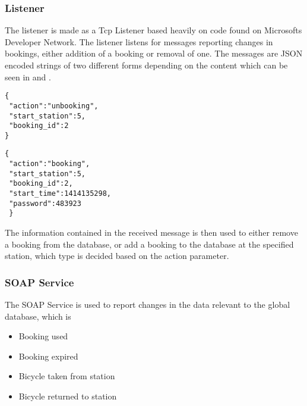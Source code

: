 \subsubsection{Listener}
The listener is made as a Tcp Listener based heavily on code found on Microsofts Developer Network\citep{misc:TcpListenerSource}. 
The listener listens for messages reporting changes in bookings, either addition of a booking or removal of one. 
The messages are JSON encoded strings of two different forms depending on the content which can be seen in  and .

\begin{minipage}{\textwidth}
\begin{minipage}{0.45\textwidth}
\begin{lstlisting}[caption = {Example of an unbooking message}, label = {lst:JsonUnbooking}]
{
 "action":"unbooking",
 "start_station":5,
 "booking_id":2
}
\end{lstlisting}
\end{minipage}
\hspace{0.5cm}
\begin{minipage}{0.45\textwidth}
\begin{lstlisting}[caption = {Example of a booking message}, label = {lst:JsonBooking}]
{
 "action":"booking",
 "start_station":5,
 "booking_id":2,
 "start_time":1414135298,
 "password":483923
 }
\end{lstlisting}
\end{minipage}
\end{minipage}

The information contained in the received message is then used to either remove a booking from the database, or add a booking to the database at the specified station, which type is decided based on the action parameter.

\subsubsection{SOAP Service}
The SOAP Service is used to report changes in the data relevant to the global database, which is

\begin{itemize}
\item Booking used
\item Booking expired
\item Bicycle taken from station
\item Bicycle returned to station
\end{itemize}

